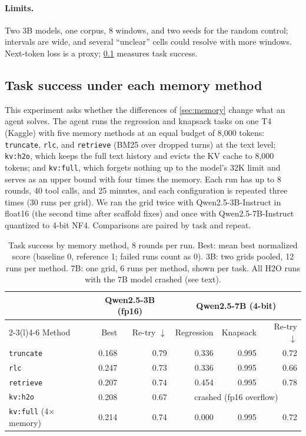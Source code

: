 \documentclass[11pt]{article}
\newcommand{\code}[1]{\texttt{#1}}
\begin{document}
\paragraph{Limits.} Two 3B models, one corpus, 8 windows, and two seeds for the random control; intervals are wide, and several ``unclear'' cells could resolve with more windows. Next-token loss is a proxy; \cref{sec:tasksuccess} measures task success.

\subsection{Task success under each memory method}
\label{sec:tasksuccess}
This experiment asks whether the differences of \cref{sec:memory} change what an agent solves. The agent runs the regression and knapsack tasks on one T4 (Kaggle) with five memory methods at an equal budget of 8,000 tokens: \code{truncate}, \code{rlc}, and \code{retrieve} (BM25 over dropped turns) at the text level; \code{kv:h2o}, which keeps the full text history and evicts the KV cache to 8,000 tokens; and \code{kv:full}, which forgets nothing up to the model's 32K limit and serves as an upper bound with four times the memory. Each run has up to 8 rounds, 40 tool calls, and 25 minutes, and each configuration is repeated three times (30 runs per grid). We ran the grid twice with Qwen2.5-3B-Instruct in float16 (the second time after scaffold fixes) and once with Qwen2.5-7B-Instruct quantized to 4-bit NF4. Comparisons are paired by task and repeat.

\begin{table}[t]
\centering
\small
\caption{Task success by memory method, 8 rounds per run. Best: mean best normalized score (baseline 0, reference 1; failed runs count as 0). 3B: two grids pooled, 12 runs per method. 7B: one grid, 6 runs per method, shown per task. All H2O runs with the 7B model crashed (see text).}
\label{tab:tasksuccess}
\begin{tabular}{@{}l r r r r r@{}}
\toprule
& \multicolumn{2}{c}{Qwen2.5-3B (fp16)} & \multicolumn{3}{c}{Qwen2.5-7B (4-bit)} \\
\cmidrule(lr){2-3}\cmidrule(l){4-6}
Method & Best & Re-try $\downarrow$ & Regression & Knapsack & Re-try $\downarrow$ \\
\midrule
\code{truncate} & 0.168 & 0.79 & 0.336 & 0.995 & 0.72 \\
\code{rlc} & 0.247 & 0.73 & 0.336 & 0.995 & 0.66 \\
\code{retrieve} & 0.207 & 0.74 & 0.454 & 0.995 & 0.78 \\
\code{kv:h2o} & 0.208 & 0.67 & \multicolumn{3}{c}{crashed (fp16 overflow)} \\
\code{kv:full} (4$\times$ memory) & 0.214 & 0.74 & 0.000 & 0.995 & 0.72 \\
\bottomrule
\end{tabular}
\end{table}
\end{document}
